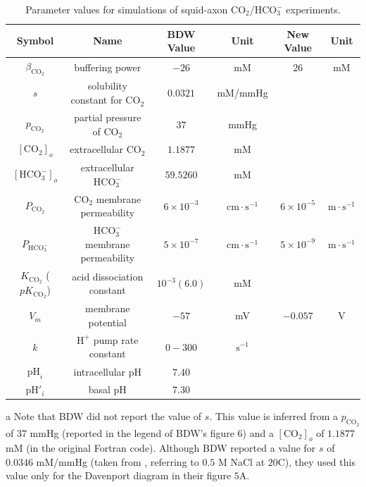 \documentclass[fleqn,10pt]{physiome}
\begin{document}
\begin{table}\centering
\caption{Parameter values for simulations of squid-axon $\mathrm{CO_2}$/$\mathrm{HCO_3^-}$ experiments.}
\begin{threeparttable}
\begin{tabular}{|c|c|c|c|c|c|}
\hline 
  \textbf{Symbol} & \textbf{Name} & \textbf{BDW Value} & \textbf{Unit} & \textbf{New Value} & \textbf{Unit} \\ 
\hline 
$\beta_\mathrm{CO_2}$ & buffering power & $-26$ & mM & $26$ & mM \\ 
\hline 
$s$ & solubility constant for $\mathrm{CO_2}$ & $0.0321$ \tnote{a} & mM/mmHg & & \\ 
\hline 
$p_\mathrm{CO_2}$ & partial pressure of $\mathrm{CO_2}$ & $37$ & mmHg &  &\\ 
\hline 
${\mathrm{[CO_2]}_o}$ & extracellular $\mathrm{CO_2}$ & $1.1877$ & mM & & \\ 
\hline
${\mathrm{[HCO_3^-]}_o}$ & extracellular $\mathrm{HCO_3^-}$ & $59.5260$ & mM & & \\ 
\hline
$P_{\mathrm{CO_2}}$ & $\mathrm{CO_2}$ membrane permeability & $6\times 10^{-3}$ & $\mathrm{cm\cdot s^{-1}}$ & $6\times 10^{-5}$ & $\mathrm{m\cdot s^{-1}}$ \\ 
\hline 
$P_{\mathrm{HCO_3^-}}$ & $\mathrm{HCO_3^-}$ membrane permeability & $5\times 10^{-7}$ & $\mathrm{cm\cdot s^{-1}}$ & $5\times 10^{-9}$ & $\mathrm{m\cdot s^{-1}}$ \\
\hline 
$K_\mathrm{CO_2}$ ($pK_\mathrm{CO_2}$) & acid dissociation constant & $10^{-3}(6.0)$ & mM & & \\
\hline 
$V_m$ & membrane potential & $-57$ \tnote{b} & mV & $-0.057$ & V \\ \hline 
$k$ & $\mathrm{H^+}$ pump rate constant & $0-300$ \tnote{c} & $\mathrm{s^{-1}}$ & & \\
\hline 
$\mathrm{pH}_i$ & intracellular $\mathrm{pH}$ & $7.40$ & & & \\
\hline 
$\mathrm{pH}'_i$ & basal $\mathrm{pH}$ & $7.30$ \tnote{d} & & & \\ 
\hline
\end{tabular}
\begin{tablenotes}
    \item[a] Note that BDW did not report the value of $s$. This value is inferred from a $p_\mathrm{CO_2}$ of $37$ mmHg (reported in the legend of BDW's figure $6$) and a $\mathrm{[CO_2]}_o$ of $1.1877$ mM (in the original Fortran code). Although BDW reported a value for $s$ of $0.0346$ mM/mmHg (taken from \cite{harned1943ionization}, referring to $0.5$ M NaCl at $20$\degree C), they used this value only for the Davenport diagram in their figure $5$A.

\end{tablenotes}
\end{threeparttable}
\end{table}
\end{document}
